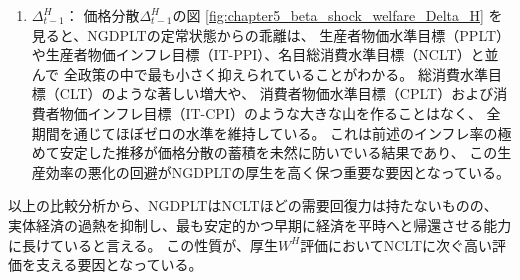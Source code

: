 \begin{enumerate}
        この定常状態からの乖離の小ささがフローの厚生損失を最小限にとどめることに貢献している。
    \item
    \label{itm:chapter5_beta_shock_policies_ngdplt_Delta_t_minus_1_H}
        \(\Delta_{t-1}^H\)：
        価格分散\(\Delta_{t-1}^H\)の図
        \ref{fig:chapter5_beta_shock_welfare_Delta_H}
        を見ると、NGDPLTの定常状態からの乖離は、
        生産者物価水準目標（PPLT）や生産者物価インフレ目標（IT-PPI）、名目総消費水準目標（NCLT）と並んで
        全政策の中で最も小さく抑えられていることがわかる。
        総消費水準目標（CLT）のような著しい増大や、
        消費者物価水準目標（CPLT）および消費者物価インフレ目標（IT-CPI）のような大きな山を作ることはなく、
        全期間を通じてほぼゼロの水準を維持している。
        これは前述のインフレ率の極めて安定した推移が価格分散の蓄積を未然に防いでいる結果であり、
        この生産効率の悪化の回避がNGDPLTの厚生を高く保つ重要な要因となっている。
\end{enumerate}
以上の比較分析から、NGDPLTはNCLTほどの需要回復力は持たないものの、
実体経済の過熱を抑制し、最も安定的かつ早期に経済を平時へと帰還させる能力に長けていると言える。
この性質が、厚生$W^H$評価においてNCLTに次ぐ高い評価を支える要因となっている。